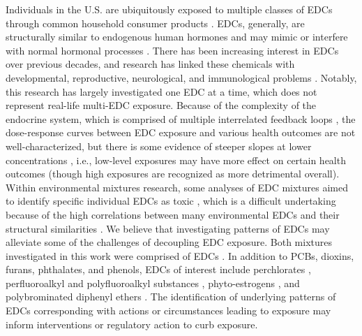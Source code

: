Individuals in the U.S. are ubiquitously exposed to multiple classes of EDCs through common household consumer products \cite{gore2015edc}. EDCs, generally, are structurally similar to endogenous human hormones and may mimic or interfere with normal hormonal processes \cite{zoeller2012endocrine}. There has been increasing interest in EDCs over previous decades, and research has linked these chemicals with developmental, reproductive, neurological, and immunological problems \cite{solomon2000environment, meeker2012exposure, kabir2015review}. Notably, this research has largely investigated one EDC at a time, which does not represent real-life multi-EDC exposure. Because of the complexity of the endocrine system, which is comprised of multiple interrelated feedback loops \cite{diamanti2009endocrine}, the dose-response curves between EDC exposure and various health outcomes are not well-characterized, but there is some evidence of steeper slopes at lower concentrations \cite{vandenberg2012hormones}, i.e., low-level exposures may have more effect on certain health outcomes (though high exposures are recognized as more detrimental overall). Within environmental mixtures research, some analyses of EDC mixtures aimed to identify specific individual EDCs as toxic \cite{tanner2020early, loftus2021exposure}, which is a difficult undertaking because of the high correlations between many environmental EDCs and their structural similarities \cite{kavlock1996research}. We believe that investigating patterns of EDCs may alleviate some of the challenges of decoupling EDC exposure. Both mixtures investigated in this work were comprised of EDCs \cite{gore2015edc, van1998toxic}. In addition to PCBs, dioxins, furans, phthalates, and phenols, EDCs of interest include perchlorates \cite{nizinski2020perchlorate}, perfluoroalkyl and polyfluoroalkyl substances \cite{pfaswebsite}, phyto-estrogens \cite{yilmaz2020endocrine}, and polybrominated diphenyl ethers \cite{gibson2018effects}. The identification of underlying patterns of EDCs corresponding with actions or circumstances leading to exposure may inform interventions or regulatory action to curb exposure.

